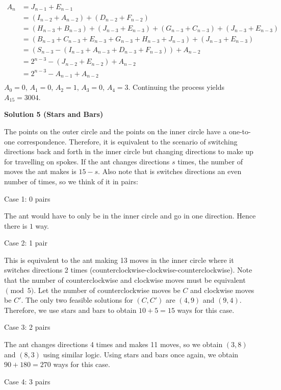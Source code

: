 \begin{enumerate}
 \begin{align*} A_n&=J_{n-1}+E_{n-1} \\ &=(I_{n-2}+A_{n-2})+(D_{n-2}+F_{n-2}) \\ &=(H_{n-3}+B_{n-3})+(J_{n-3}+E_{n-3})+(G_{n-3}+C_{n-3})+(J_{n-3}+E_{n-3}) \\ &=(B_{n-3}+C_{n-3}+E_{n-3}+G_{n-3}+H_{n-3}+J_{n-3})+(J_{n-3}+E_{n-3}) \\ &=(S_{n-3}-(I_{n-3}+A_{n-3}+D_{n-3}+F_{n-3}))+A_{n-2} \\ &=2^{n-3}-(J_{n-2}+E_{n-2})+A_{n-2} \\ &=2^{n-3}-A_{n-1}+A_{n-2} \\ \end{align*}
$A_0=0$, $A_1=0$, $A_2=1$, $A_3=0$, $A_4=3$. Continuing the process yields $A_{15}=3\boxed{004}$.

 



\textbf{Solution 5 (Stars and Bars)}

The points on the outer circle and the points on the inner circle have a one-to-one correspondence. Therefore, it is equivalent to the scenario of switching directions back and forth in the inner circle but changing directions to make up for travelling on spokes. If the ant changes directions $s$ times, the number of moves the ant makes is $15-s$. Also note that is switches directions an even number of times, so we think of it in pairs:

 Case 1: 0 pairs

 The ant would have to only be in the inner circle and go in one direction. Hence there is $1$ way.

 Case 2: 1 pair

 This is equivalent to the ant making 13 moves in the inner circle where it switches directions 2 times (counterclockwise-clockwise-counterclockwise). Note that the number of counterclockwise and clockwise moves must be equivalent$\pmod{5}$. Let the number of counterclockwise moves be $C$ and clockwise moves be $C'$. The only two feasible solutions for $(C,C')$ are $(4,9)$ and $(9,4)$. Therefore, we use stars and bars to obtain $10+5=15$ ways for this case. 

 Case 3: 2 pairs

 The ant changes directions 4 times and makes 11 moves, so we obtain $(3,8)$ and $(8,3)$ using similar logic. Using stars and bars once again, we obtain $90+180=270$ ways for this case.

 Case 4: 3 pairs


\end{enumerate}
